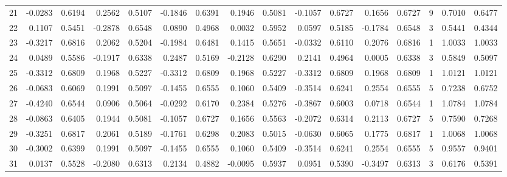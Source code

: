 \begin{tabular}{lrrrrrrrrrrrrrrr}
21  &     -0.0283 &  0.6194 &  0.2562 &  0.5107 & -0.1846 &  0.6391 &  0.1946 &  0.5081 & -0.1057 &  0.6727 &   0.1656 &     0.6727 &      9 &                    0.7010 &                     0.6477 \\
22  &      0.1107 &  0.5451 & -0.2878 &  0.6548 &  0.0890 &  0.4968 &  0.0032 &  0.5952 &  0.0597 &  0.5185 &  -0.1784 &     0.6548 &      3 &                    0.5441 &                     0.4344 \\
23  &     -0.3217 &  0.6816 &  0.2062 &  0.5204 & -0.1984 &  0.6481 &  0.1415 &  0.5651 & -0.0332 &  0.6110 &   0.2076 &     0.6816 &      1 &                    1.0033 &                     1.0033 \\
24  &      0.0489 &  0.5586 & -0.1917 &  0.6338 &  0.2487 &  0.5169 & -0.2128 &  0.6290 &  0.2141 &  0.4964 &   0.0005 &     0.6338 &      3 &                    0.5849 &                     0.5097 \\
25  &     -0.3312 &  0.6809 &  0.1968 &  0.5227 & -0.3312 &  0.6809 &  0.1968 &  0.5227 & -0.3312 &  0.6809 &   0.1968 &     0.6809 &      1 &                    1.0121 &                     1.0121 \\
26  &     -0.0683 &  0.6069 &  0.1991 &  0.5097 & -0.1455 &  0.6555 &  0.1060 &  0.5409 & -0.3514 &  0.6241 &   0.2554 &     0.6555 &      5 &                    0.7238 &                     0.6752 \\
27  &     -0.4240 &  0.6544 &  0.0906 &  0.5064 & -0.0292 &  0.6170 &  0.2384 &  0.5276 & -0.3867 &  0.6003 &   0.0718 &     0.6544 &      1 &                    1.0784 &                     1.0784 \\
28  &     -0.0863 &  0.6405 &  0.1944 &  0.5081 & -0.1057 &  0.6727 &  0.1656 &  0.5563 & -0.2072 &  0.6314 &   0.2113 &     0.6727 &      5 &                    0.7590 &                     0.7268 \\
29  &     -0.3251 &  0.6817 &  0.2061 &  0.5189 & -0.1761 &  0.6298 &  0.2083 &  0.5015 & -0.0630 &  0.6065 &   0.1775 &     0.6817 &      1 &                    1.0068 &                     1.0068 \\
30  &     -0.3002 &  0.6399 &  0.1991 &  0.5097 & -0.1455 &  0.6555 &  0.1060 &  0.5409 & -0.3514 &  0.6241 &   0.2554 &     0.6555 &      5 &                    0.9557 &                     0.9401 \\
31  &      0.0137 &  0.5528 & -0.2080 &  0.6313 &  0.2134 &  0.4882 & -0.0095 &  0.5937 &  0.0951 &  0.5390 &  -0.3497 &     0.6313 &      3 &                    0.6176 &                     0.5391 \\

\end{tabular}
